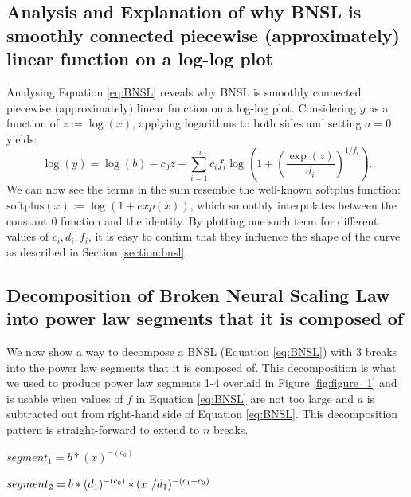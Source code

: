 \documentclass{article} %
\begin{document}

\subsection{Analysis and Explanation of why BNSL is smoothly connected piecewise (approximately) linear function on a log-log plot}
\label{section:bnsl_analysis}

\vspace{-1mm}

Analysing Equation \ref{eq:BNSL} reveals why BNSL is smoothly connected piecewise (approximately) linear function on a log-log plot. %
Considering $y$ as a function of $z:=\log(x)$, applying logarithms to both sides and setting $a=0$ yields:
\begin{equation}
\log (y) =  \log (b) - c_0 z -  \sum_{i=1}^n c_i f_i \log\left(1 + \left(\frac{\exp(z)}{d_i}\right)^{1/f_i}\right).
\end{equation}
We can now see the terms in the sum resemble the well-known $\mathrm{softplus}$ function: $\mathrm{softplus}(x) := \log(1 + exp(x))$, which smoothly interpolates between the constant 0 function and the identity.
By plotting one such term for different values of $c_i, d_i, f_i$, it is easy to confirm that they influence the shape of the curve as described in Section \ref{section:bnsl}.


\subsection{Decomposition of Broken Neural Scaling Law into power law segments that it is composed of}
\label{section:decomposition_of_BNSL}

\vspace{-1mm}

We now show a way to decompose a BNSL (Equation \ref{eq:BNSL}) with 3 breaks into the power law segments that it is composed of. This decomposition is what we used to produce power law segments 1-4 overlaid in Figure \ref{fig:figure_1} and is usable when values of $f$ in Equation \ref{eq:BNSL} are not too large and $a$ is subtracted out from right-hand side of Equation \ref{eq:BNSL}. This decomposition pattern is straight-forward to extend to $n$ breaks.

$segment_1 = b * (x)^{-(c_0)}$

$segment_2 = b * (d_1)^{-(c_0)} * (x\hspace{.14cm}/d_1)^{-(c_1+c_0)}$
\end{document}
